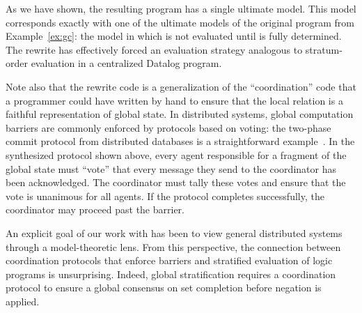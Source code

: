 As we have shown, the resulting program has a single ultimate model.  This model
corresponds exactly with one of the ultimate models of the original program from
Example~\ref{ex:gc}: the model in which  is not evaluated until
 is fully determined.  The rewrite has effectively forced an
evaluation strategy analogous to stratum-order evaluation in a centralized
Datalog program.

Note also that the rewrite code is a generalization of the ``coordination'' code
that a \lang programmer could have written by hand to ensure that the local
relation  is a faithful representation of global state.  
In
distributed systems, global computation barriers are commonly enforced by
protocols based on voting: the two-phase commit protocol from distributed
databases is a straightforward example~\cite{gray-tp}.  In the synthesized protocol shown above, every agent
responsible for a fragment of the global state must ``vote'' that every message
they send to the coordinator has been acknowledged.  The coordinator must tally
these votes and ensure that the vote is unanimous for all agents.  If the
protocol completes successfully, the coordinator may proceed past the barrier.

An explicit goal of our work with \lang has been to view general distributed
systems through a model-theoretic lens.  From this perspective, the connection
between coordination protocols that enforce barriers and stratified evaluation 
of logic programs is unsurprising.  Indeed, global stratification requires
a coordination protocol to ensure a global consensus on set completion before
negation is applied.





